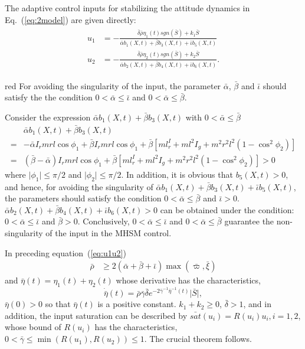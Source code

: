 The adaptive control inputs for stabilizing the attitude dynamics in Eq.~(\ref{eq:2model}) are given directly:
\begin{align}
\begin{split}
u_1 &= -\frac{\bar\delta\bar\rho\eta_1(t)sgn(\bar S)+k_1\bar S}{\bar\alpha b_1(X,t) + \bar\beta b_3(X,t) + \bar\iota b_5(X,t)}\\
u_2 &= -\frac{\bar\delta\bar\rho\eta_2(t)sgn(\bar S)+k_2\bar S}{\bar\alpha b_2(X,t) + \bar\beta b_4(X,t) + \bar\iota b_6(X,t)}.
\end{split}\label{eq:u1u2}
\end{align}\par
\begin{color}{red}
For avoiding the singularity of the input, the parameter $\bar\alpha$, $\bar\beta$ and $\bar\iota$ should satisfy the the condition $0<\bar\alpha\le\bar\iota$ and $0<\bar\alpha\le\bar\beta$.\par
    Consider the expression $\bar\alpha b_1(X,t) + \bar\beta b_3(X,t)$ with $0<\bar\alpha\le \bar\beta$
    \begin{align*}
    &\bar\alpha b_1(X,t) + \bar\beta b_3(X,t)\\
    =&-\bar\alpha I_rmrl\cos\phi_1 + \bar\beta I_rmrl\cos\phi_1+\bar\beta[ml^I_r+ml^2I_g+m^2r^2l^2(1-\cos^2\phi_2)]\\
    =&(\bar\beta-\bar\alpha) I_rmrl\cos\phi_1+\bar\beta[ml^I_r+ml^2I_g+m^2r^2l^2(1-\cos^2\phi_2)]>0
    \end{align*}
    where $\vert\phi_1\vert\le\pi/2$ and $\vert\phi_2\vert\le\pi/2$.
    In addition, it is obvious that $b_5(X,t)>0$, and hence, for avoiding the singularity of $\bar\alpha b_1(X,t) + \bar\beta b_3(X,t) + \bar\iota b_5(X,t)$,  the parameters should satisfy the condition $0<\bar\alpha\le\bar\beta$ and $\bar\iota>0$. $\bar\alpha b_2(X,t) + \bar\beta b_4(X,t) + \bar\iota b_6(X,t)>0$ can be obtained under the condition: $0<\bar\alpha\le\bar\iota$ and $\bar\beta>0$. Conclusively, $0<\bar\alpha\le\bar\iota$ and $0<\bar\alpha\le\bar\beta$ guarantee the non-singularity of the input in the MHSM control.
\end{color}
In preceding equation~(\ref{eq:u1u2})
\begin{align}
\bar\rho &\ge 2(\bar\alpha + \bar\beta + \bar\iota)\max(\bar\varpi,\bar\xi)
\end{align}
and $\bar\eta(t)=\eta_1(t)+\eta_2(t)$ whose derivative has the characteristics, $$\dot{{\bar\eta}}(t) = \bar\rho\bar\gamma\bar\delta e^{-2\bar\gamma^{-1}{\bar\eta}^{-1}(t)}\vert \bar S\vert,$$ $\bar\eta(0) > 0$ so that $\bar\eta(t)$ is a positive constant. $k_1+k_2\ge 0$, $\bar\delta >1$, and in addition, the input saturation can be described by $\bar{sat}(u_i) = R(u_i)u_i, i =1,2$, whose bound of $R(u_i)$ has the characteristics, $0<\bar\gamma\le \min(R(u_1),R(u_2))\le 1$. The crucial theorem follows.
